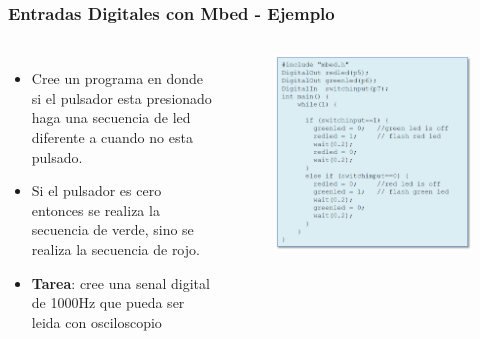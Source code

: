 \documentclass[10.5pt,scale=1.0,t,aspectratio=169,hyperref={pdfpagelabels=false}]{beamer}
\begin{document}
\begin{frame}
	\frametitle{Entradas Digitales con Mbed - Ejemplo}
	\begin{columns}
		\begin{itemize}
			\item Cree un programa en donde si el pulsador esta presionado haga una secuencia de led diferente a cuando no esta pulsado.
			\item Si el pulsador es cero entonces se realiza la secuencia de verde, sino se realiza la secuencia de rojo. 
			\item \textbf{Tarea}: cree una senal digital de 1000Hz que pueda ser leida con osciloscopio
		\end{itemize}
		 
		
		\begin{figure}
			\centering
			\includegraphics[scale=0.35]{06_EjemploIn}
		\end{figure}
	\end{columns}
\end{frame}
\end{document}
